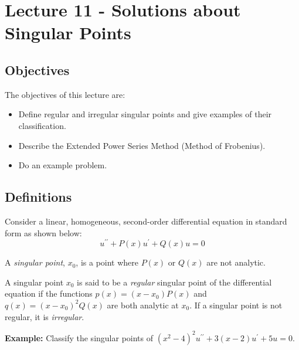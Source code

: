 \chapter{Lecture 11 - Solutions about Singular Points}
\label{ch:lec11}
\section{Objectives}
The objectives of this lecture are:
\begin{itemize}
\item Define regular and irregular singular points and give examples of their classification.
\item Describe the Extended Power Series Method (Method of Frobenius).
\item Do an example problem.
\end{itemize}

\section{Definitions}
Consider a linear, homogeneous, second-order differential equation in standard form as shown below:
\begin{equation*}
u^{\prime \prime} + P(x)u^{\prime} + Q(x)u = 0
\end{equation*}

\begin{definition}
A \emph{singular point}, $x_0$, is a point where $P(x)$ or $Q(x)$ are not analytic.
\end{definition}

\begin{definition}
A singular point $x_0$ is said to be a \emph{regular} singular point of the differential equation if the functions $p(x)=(x-x_0)P(x)$ and $q(x)=(x-x_0)^2Q(x)$ are both analytic at $x_0$.  If a singular point is not regular, it is \emph{irregular}.
\end{definition}

\noindent\textbf{Example:} Classify the singular points of $(x^2-4)^2u^{\prime\prime}+3(x-2)u^{\prime}+5u = 0$.

\vspace{0.5cm}

